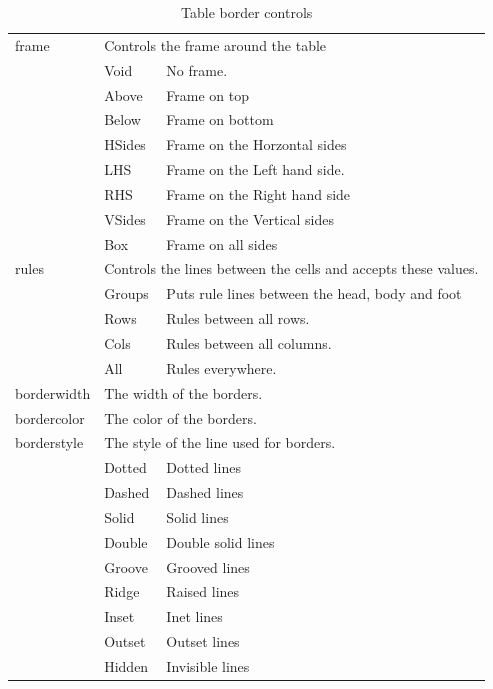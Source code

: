 \begin{table}\caption{Table border controls}
\label{table_attribute rules}
\begin{tabular}{l|l|l} \\ \hline
frame & \multicolumn{2}{|l}{Controls the frame around the table}\\
      & Void & No frame. \\
      & Above & Frame on top \\
      & Below & Frame on bottom \\ 
      & HSides & Frame on the Horzontal sides \\ 
      & LHS & Frame on the Left hand side. \\
      & RHS & Frame on the Right hand side \\
      & VSides & Frame on the Vertical sides \\
      & Box & Frame on all sides \\ \hline
rules & \multicolumn{2}{|l}{Controls the lines between the cells and accepts these values.}\\
      & Groups & Puts rule lines between the head, body and foot\\
      & Rows & Rules between all rows. \\
      & Cols & Rules between all columns.\\
      & All & Rules everywhere. \\ \hline
borderwidth & \multicolumn{2}{|l}{The width of the borders.} \\
bordercolor & \multicolumn{2}{|l}{The color of the borders.} \\ \hline
borderstyle & \multicolumn{2}{|l}{The style of the line used for borders.} \\
            & Dotted & Dotted lines \\
            & Dashed & Dashed lines \\
            & Solid & Solid lines \\
            & Double & Double solid lines \\
            & Groove & Grooved lines \\
            & Ridge & Raised lines \\
            & Inset & Inet lines \\
            & Outset & Outset lines \\
            & Hidden & Invisible lines  
\end{tabular}
\end{table}

